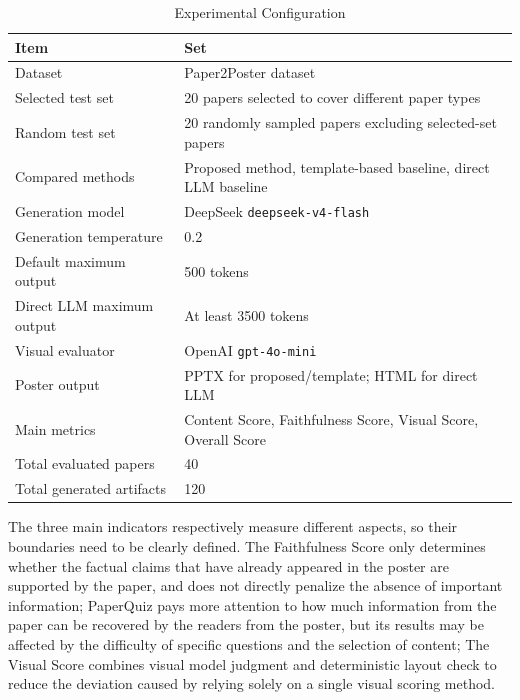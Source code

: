 \documentclass[12pt,oneside]{report}
\begin{document}
\begin{table}[H]
\centering
\small
\setlength{\tabcolsep}{5pt}
\renewcommand{\arraystretch}{1.2}
\caption{Experimental Configuration}
\label{tab:experimental_settings}

\begin{tabularx}{\textwidth}{lY}
\toprule
\textbf{Item} & \textbf{Set} \\
\midrule
Dataset & Paper2Poster dataset \\
Selected test set & 20 papers selected to cover different paper types \\
Random test set & 20 randomly sampled papers excluding selected-set papers \\
Compared methods & Proposed method, template-based baseline, direct LLM baseline \\
Generation model & DeepSeek \texttt{deepseek-v4-flash} \\
Generation temperature & 0.2 \\
Default maximum output & 500 tokens \\
Direct LLM maximum output & At least 3500 tokens \\
Visual evaluator & OpenAI \texttt{gpt-4o-mini} \\
Poster output & PPTX for proposed/template; HTML for direct LLM \\
Main metrics & Content Score, Faithfulness Score, Visual Score, Overall Score \\
Total evaluated papers & 40 \\
Total generated artifacts & 120 \\
\bottomrule
\end{tabularx}
\end{table}

The three main indicators respectively measure different aspects, so their boundaries need to be clearly defined. The Faithfulness Score only determines whether the factual claims that have already appeared in the poster are supported by the paper, and does not directly penalize the absence of important information; PaperQuiz pays more attention to how much information from the paper can be recovered by the readers from the poster, but its results may be affected by the difficulty of specific questions and the selection of content; The Visual Score combines visual model judgment and deterministic layout check to reduce the deviation caused by relying solely on a single visual scoring method.

\vspace{1em}
\end{document}
